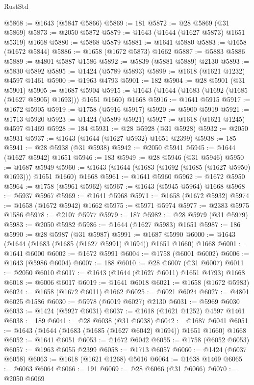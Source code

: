 \begin{lexlean}{RustStd}
\begin{coremodule}
@5868 := @1643 (@5847 @5866)
@5869 := 181
@5872 := @28 @5869 (@31 @5869)
@5873 := @2050 @5872
@5879 := @1643 (@1644 (@1627 @5873) @1651 @5319) @1668
@5880 := @5868 @5879
@5881 := @1641 @5880
@5883 := @1658 (@1672 @5844)
@5886 := @1658 (@1672 @5873) @1662
@5887 := @5883 @5886
@5889 := @4801 @5887 @1586
@5892 := @5839 (@5881 @5889) @2130
@5893 := @5830 @5892
@5895 := @1424 (@5789 @5893)
@5899 := @1618 (@1621 @1232) @4597 @1461
@5900 := @1963 @4793
@5901 := 182
@5904 := @28 @5901 (@31 @5901)
@5905 := @1687 @5904
@5915 := @1643 (@1644 (@1683 (@1692 (@1685 (@1627 @5905) @1693))) @1651 @1660) @1668
@5916 := @1641 @5915
@5917 := @1672 @5905
@5919 := @1758 (@5916 @5917)
@5920 := @5900 @5919
@5921 := @1713 @5920
@5923 := @1424 (@5899 @5921)
@5927 := @1618 (@1621 @1245) @4597 @1469
@5928 := 184
@5931 := @28 @5928 (@31 @5928)
@5932 := @2050 @5931
@5937 := @1643 (@1644 (@1627 @5932) @1651 @2399)
@5938 := 185
@5941 := @28 @5938 (@31 @5938)
@5942 := @2050 @5941
@5945 := @1644 (@1627 @5942) @1651
@5946 := 183
@5949 := @28 @5946 (@31 @5946)
@5950 := @1687 @5949
@5960 := @1643 (@1644 (@1683 (@1692 (@1685 (@1627 @5950) @1693))) @1651 @1660) @1668
@5961 := @1641 @5960
@5962 := @1672 @5950
@5964 := @1758 (@5961 @5962)
@5967 := @1643 (@5945 @5964) @1668
@5968 := @5937 @5967
@5969 := @1641 @5968
@5971 := @1658 (@1672 @5932)
@5974 := @1658 (@1672 @5942) @1662
@5975 := @5971 @5974
@5977 := @2383 @5975 @1586
@5978 := @2107 @5977
@5979 := 187
@5982 := @28 @5979 (@31 @5979)
@5983 := @2050 @5982
@5986 := @1644 (@1627 @5983) @1651
@5987 := 186
@5990 := @28 @5987 (@31 @5987)
@5991 := @1687 @5990
@6000 := @1643 (@1644 (@1683 (@1685 (@1627 @5991) @1694)) @1651 @1660) @1668
@6001 := @1641 @6000
@6002 := @1672 @5991
@6004 := @1758 (@6001 @6002)
@6006 := @1643 (@5986 @6004)
@6007 := 188
@6010 := @28 @6007 (@31 @6007)
@6011 := @2050 @6010
@6017 := @1643 (@1644 (@1627 @6011) @1651 @4793) @1668
@6018 := @6006 @6017
@6019 := @1641 @6018
@6021 := @1658 (@1672 @5983)
@6024 := @1658 (@1672 @6011) @1662
@6025 := @6021 @6024
@6027 := @4801 @6025 @1586
@6030 := @5978 (@6019 @6027) @2130
@6031 := @5969 @6030
@6033 := @1424 (@5927 @6031)
@6037 := @1618 (@1621 @1252) @4597 @1461
@6038 := 189
@6041 := @28 @6038 (@31 @6038)
@6042 := @1687 @6041
@6051 := @1643 (@1644 (@1683 (@1685 (@1627 @6042) @1694)) @1651 @1660) @1668
@6052 := @1641 @6051
@6053 := @1672 @6042
@6055 := @1758 (@6052 @6053)
@6057 := @1963 @6055 @2399
@6058 := @1713 @6057
@6060 := @1424 (@6037 @6058)
@6063 := @1618 (@1621 @1268) @5616
@6064 := @1638 @1469
@6065 := @6063 @6064
@6066 := 191
@6069 := @28 @6066 (@31 @6066)
@6070 := @2050 @6069

\end{coremodule}
\end{lexlean}

